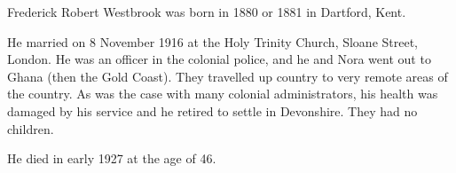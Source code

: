 
Frederick Robert Westbrook was born in 1880 or 1881 in Dartford, Kent.\cite{FrederickWestbrookBirth, FrederickWestbrookDeath} 

He married  on 8 November 1916 at the Holy Trinity Church, Sloane Street, London. \cite{NoraMundayMarriage}  He was an officer in the colonial police, and he and Nora went out to Ghana (then the Gold Coast). They travelled up country to very remote areas of the country.
As was the case with many colonial administrators, his health was damaged by his service and he retired to settle in Devonshire. They had no children.

He died in early 1927 at the age of 46.\cite{FrederickWestbrookDeath}
